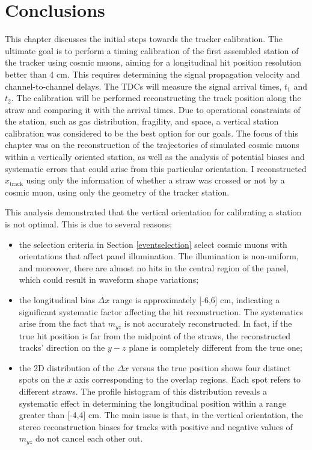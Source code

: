   \section{Conclusions}
  This chapter discusses the initial steps towards the tracker calibration.
  The ultimate goal is to perform a timing calibration of 
  the first assembled station of the tracker using cosmic muons, aiming for a longitudinal hit 
  position resolution better than 4 cm. This requires determining the signal propagation velocity and 
  channel-to-channel delays. The TDCs will measure the signal arrival times, $t_1$ and $t_2$. 
  The calibration will be performed reconstructing the track position along the straw and comparing it with the arrival times. 
  Due to operational constraints of the station, such as gas distribution, fragility, and space, a 
  vertical station calibration was considered to be the best option for our goals.
  The focus of this chapter was on the reconstruction of the trajectories 
  of simulated cosmic muons within a vertically oriented station, as well as the 
  analysis of potential biases and systematic errors that could arise from this particular orientation. 
  I reconstructed $x_{\text{track}}$ using only the information of whether a straw was crossed 
  or not by a cosmic muon, using only the geometry of the tracker station.

This analysis demonstrated that the vertical orientation for calibrating a station is not optimal. This is due to several reasons:
\begin{itemize}
    \item the selection criteria in Section \ref{eventselection} select cosmic muons with orientations that affect panel illumination. 
      The illumination is non-uniform, and moreover, there are almost no hits in the central region of the panel, which could result in waveform shape variations;
    \item the longitudinal bias $\Delta x$ range is approximately [-6,6] cm, indicating a significant systematic factor 
    affecting the hit reconstruction. The systematics arise from the fact that $m_{yz}$ is not accurately reconstructed.
    In fact, if the true hit position is far from the midpoint of the straws, the reconstructed tracks'
    direction on the $y-z$ plane is completely different from the true one;
    \item the 2D distribution of the $\Delta x$ versus the true position shows 
    four distinct spots on the $x$ axis corresponding to the overlap regions. Each spot refers to different straws. 
    The profile histogram of this distribution reveals a systematic effect in determining the 
    longitudinal position within a range greater than [-4,4] cm. The main issue is that, in the vertical orientation, the stereo 
    reconstruction biases for tracks with positive and negative values of $m_{yz}$ do not cancel each other out.
\end{itemize}

